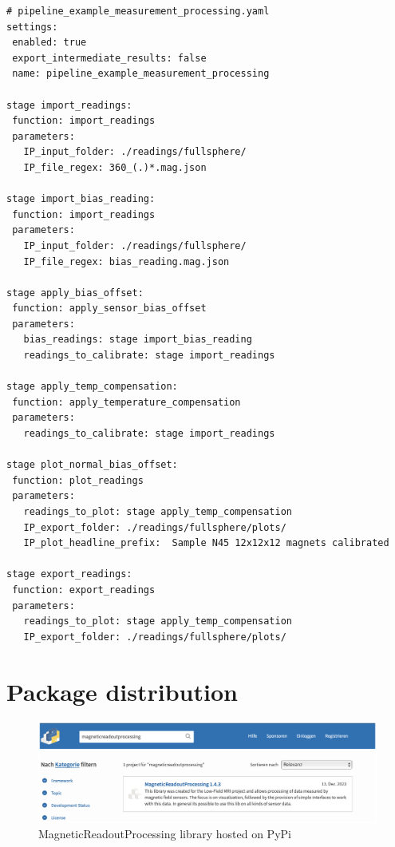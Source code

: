 \begin{lstlisting}
# pipeline_example_measurement_processing.yaml
settings:
 enabled: true
 export_intermediate_results: false
 name: pipeline_example_measurement_processing

stage import_readings:
 function: import_readings
 parameters:
   IP_input_folder: ./readings/fullsphere/
   IP_file_regex: 360_(.)*.mag.json

stage import_bias_reading:
 function: import_readings
 parameters:
   IP_input_folder: ./readings/fullsphere/
   IP_file_regex: bias_reading.mag.json

stage apply_bias_offset:
 function: apply_sensor_bias_offset
 parameters:
   bias_readings: stage import_bias_reading
   readings_to_calibrate: stage import_readings

stage apply_temp_compensation:
 function: apply_temperature_compensation
 parameters:
   readings_to_calibrate: stage import_readings

stage plot_normal_bias_offset:
 function: plot_readings
 parameters:
   readings_to_plot: stage apply_temp_compensation
   IP_export_folder: ./readings/fullsphere/plots/
   IP_plot_headline_prefix:  Sample N45 12x12x12 magnets calibrated

stage export_readings:
 function: export_readings
 parameters:
   readings_to_plot: stage apply_temp_compensation
   IP_export_folder: ./readings/fullsphere/plots/
\end{lstlisting}

\hypertarget{package-distribution}{%
\section{Package distribution}\label{package-distribution}}

\begin{figure}
\centering
\includegraphics{./generated_images/border_MagneticReadoutProcessing_library_hosted_on_PyPi.png}
\caption{MagneticReadoutProcessing library hosted on PyPi
\label{MagneticReadoutProcessing_library_hosted_on_PyPi.png}}
\end{figure}

